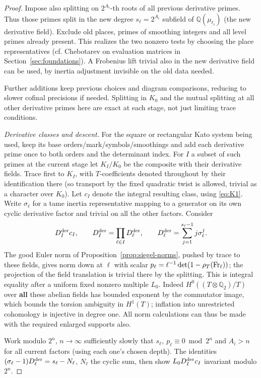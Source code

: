 \begin{proof}
Impose also splitting on \(2^{A_i}\)-th roots of all previous derivative primes. Thus those primes split in the new degree \(s_\ell=2^{A_i}\) subfield of \(\mathbb Q(\mu_{\ell_i})\) (the new derivative field). Exclude old places, primes of smoothing integers and all level primes already present. This realizes the two nonzero tests by choosing the place representatives (cf. Chebotarev on evaluation matrices in Section~\ref{sec:foundations}). A Frobenius lift trivial also in the new derivative field can be used, by inertia adjustment invisible on the old data needed. 

Further additions keep previous choices and diagram comparisons, reducing to slower cofinal precisions if needed. Splitting in \(K_0\) and the mutual splitting at all other derivative primes here are exact at each stage, not just limiting trace conditions.

\emph{Derivative classes and descent.}
For the square or rectangular Kato system being used, keep its base orders/mark/symbols/smoothings and add each derivative prime once to both orders and the determinant index. For \(I\) a subset of such primes at the current stage let \(K_I/K_0\) be the composite with their derivative fields. Trace first to \(K_I\), with \(T\)-coefficients denoted throughout by their identification there (so transport by the fixed quadratic twist is allowed, trivial as a character over \(K_0\)). Let \(c_I\) denote the integral resulting class, using \eqref{eq:K1}. Write \(\sigma_\ell\) for a tame inertia representative mapping to a generator on its own cyclic derivative factor and trivial on all the other factors. Consider
\[
          D_I^{\rm der} c_I,\qquad
          D_I^{\rm der}=\prod_{\ell\in I} D^{\rm der}_\ell,\qquad
          D^{\rm der}_\ell=\sum_{j=1}^{s_\ell-1}j\sigma_\ell^j .
\]
The good Euler norm of Proposition~\ref{prop:siegel-norms}, pushed by trace to these fields, gives norm down at \(\ell\) with scalar
\(p_\ell=\ell^{-1}\det(1-\rho_T({\rm Fr}_\ell))\); the projection of the field translation is trivial there by the splitting. This is integral equality after a uniform fixed nonzero multiple \(L_0\). Indeed \(H^0((T\otimes\mathbb Q_2)/T)\) over \textbf{all} these abelian fields has bounded exponent by the commutator image, which bounds the torsion ambiguity in \(H^1(T)\); inflation into unrestricted cohomology is injective in degree one. All norm calculations can thus be made with the required enlarged supports also.

Work modulo \(2^n\), \(n\to\infty\) sufficiently slowly that \(s_\ell,\ p_\ell\equiv0\bmod 2^n\) and \(A_i>n\) for all current factors (using each one's chosen depth). The identities \((\sigma_\ell-1)D_\ell^{\rm der}=s_\ell-N_\ell\), \(N_\ell\) the cyclic sum, then show \(L_0 D_I^{\rm der}c_I\) invariant modulo \(2^n\). 


\end{proof}
